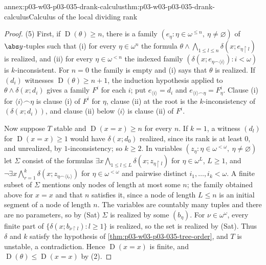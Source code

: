 \begin{annexitem}{annex:p03-w03-p03-035-drank-calculus}{thm:p03-w03-p03-035-drank-calculus}{Calculus of the local dividing rank}
\begin{proof}
(5) First, if \(\operatorname D(\theta)\geq n\), there is a family
\((e_\eta:\eta\in\omega^{\leq n},\ \eta\neq\varnothing)\) of \(\abs y\)-tuples
such that (i) for every \(\eta\in\omega^{n}\) the formula
\(\theta\wedge\bigwedge_{1\leq l\leq n}\delta(x;e_{\eta\restriction l})\) is
realized, and (ii) for every \(\eta\in\omega^{<n}\) the indexed family
\((\delta(x;e_{\eta\frown\langle i\rangle}):i<\omega)\) is
\(k\)-inconsistent.  For \(n=0\) the family is empty and (i) says that
\(\theta\) is realized.  If \((d_i)\) witnesses
\(\operatorname D(\theta)\geq n+1\), the induction hypothesis applied to
\(\theta\wedge\delta(x;d_i)\) gives a family \(F^i\) for each \(i\); put
\(e_{\langle i\rangle}=d_i\) and \(e_{\langle i\rangle\frown\eta}=F^i_\eta\).
Clause (i) for \(\langle i\rangle\frown\eta\) is clause (i) of \(F^i\) for
\(\eta\), clause (ii) at the root is the \(k\)-inconsistency of
\((\delta(x;d_i))\), and clause (ii) below \(\langle i\rangle\) is clause
(ii) of \(F^i\).

Now suppose \(T\) stable and \(\operatorname D(x=x)\geq n\) for every \(n\).
If \(k=1\), a witness \((d_l)\) for \(\operatorname D(x=x)\geq1\) would have
\(\delta(x;d_0)\) realized, since its rank is at least \(0\), and
unrealized, by \(1\)-inconsistency; so \(k\geq2\).  In
variables \((z_\eta:\eta\in\omega^{<\omega},\ \eta\neq\varnothing)\) let
\(\Sigma\) consist of the formulas
\(\exists x\bigwedge_{1\leq l\leq L}\delta(x;z_{\eta\restriction l})\) for
\(\eta\in\omega^{L}\), \(L\geq1\), and
\(\neg\exists x\bigwedge_{r=1}^{k}\delta(x;z_{\eta\frown\langle i_r\rangle})\)
for \(\eta\in\omega^{<\omega}\) and pairwise distinct
\(i_1,\ldots,i_k<\omega\).  A finite subset of \(\Sigma\) mentions only nodes
of length at most some \(n\); the family obtained above for \(x=x\) and that
\(n\) satisfies it, since a node of length \(L\leq n\) is an initial segment
of a node of length \(n\).  The variables are countably many tuples and
there are no parameters, so by (Sat) \(\Sigma\) is realized by some
\((b_\eta)\).  For \(\nu\in\omega^\omega\), every finite part of
\(\{\delta(x;b_{\nu\restriction l}):l\geq1\}\) is realized, so the set is
realized by (Sat).  Thus \(\delta\) and \(k\) satisfy the hypothesis of
\cref{thm:p03-w03-p03-035-tree-order}, and \(T\) is unstable, a
contradiction.  Hence \(\operatorname D(x=x)\) is finite, and
\(\operatorname D(\theta)\leq\operatorname D(x=x)\) by (2).
\end{proof}
\end{annexitem}

